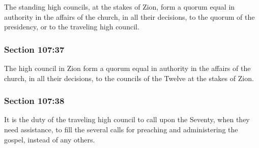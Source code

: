 		The standing high councils, at the stakes of Zion, form a quorum equal in authority in the affairs of the church, in all their decisions, to the quorum of the presidency, or to the traveling high council.


	\subsubsection{Section 107:37} %
		\label{DC107-37}

		The high council in Zion form a quorum equal in authority in the affairs of the church, in all their decisions, to the councils of the Twelve at the stakes of Zion.


	\subsubsection{Section 107:38} %
		\label{DC107-38}

		It is the duty of the traveling high council to call upon the Seventy, when they need assistance, to fill the several calls for preaching and administering the gospel, instead of any others.


